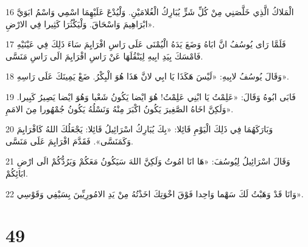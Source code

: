 \par 16 الْمَلاكُ الَّذِي خَلَّصَنِي مِنْ كُلِّ شَرٍّ يُبَارِكُ الْغُلامَيْنِ. وَلْيُدْعَ عَلَيْهِمَا اسْمِي وَاسْمُ ابَوَيَّ ابْرَاهِيمَ وَاسْحَاقَ. وَلْيَكْثُرَا كَثِيرا فِي الارْضِ».
\par 17 فَلَمَّا رَاى يُوسُفُ انَّ ابَاهُ وَضَعَ يَدَهُ الْيُمْنَى عَلَى رَاسِ افْرَايِمَ سَاءَ ذَلِكَ فِي عَيْنَيْهِ فَامْسَكَ بِيَدِ ابِيهِ لِيَنْقُلَهَا عَنْ رَاسِ افْرَايِمَ الَى رَاسِ مَنَسَّى.
\par 18 وَقَالَ يُوسُفُ لابِيهِ: «لَيْسَ هَكَذَا يَا ابِي لانَّ هَذَا هُوَ الْبِكْرُ. ضَعْ يَمِينَكَ عَلَى رَاسِهِ».
\par 19 فَابَى ابُوهُ وَقَالَ: «عَلِمْتُ يَا ابْنِي عَلِمْتُ! هُوَ ايْضا يَكُونُ شَعْبا وَهُوَ ايْضا يَصِيرُ كَبِيرا. وَلَكِنَّ اخَاهُ الصَّغِيرَ يَكُونُ اكْبَرَ مِنْهُ وَنَسْلُهُ يَكُونُ جُمْهُورا مِنَ الامَمِ».
\par 20 وَبَارَكَهُمَا فِي ذَلِكَ الْيَوْمِ قَائِلا: «بِكَ يُبَارِكُ اسْرَائِيلُ قَائِلا: يَجْعَلُكَ اللهُ كَافْرَايِمَ وَكَمَنَسَّى». فَقَدَّمَ افْرَايِمَ عَلَى مَنَسَّى.
\par 21 وَقَالَ اسْرَائِيلُ لِيُوسُفَ: «هَا انَا امُوتُ وَلَكِنَّ اللهَ سَيَكُونُ مَعَكُمْ وَيَرُدُّكُمْ الَى ارْضِ ابَائِكُمْ.
\par 22 وَانَا قَدْ وَهَبْتُ لَكَ سَهْما وَاحِدا فَوْقَ اخْوَتِكَ اخَذْتُهُ مِنْ يَدِ الامُورِيِّينَ بِسَيْفِي وَقَوْسِي».

\chapter{49}

